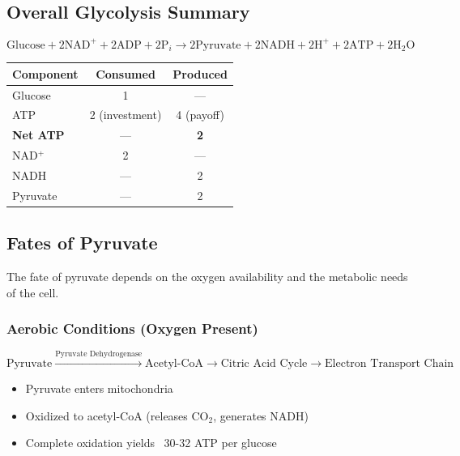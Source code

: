 \subsection{Overall Glycolysis Summary}

\begin{center}
\begin{tcolorbox}[colback=yellow!10, colframe=orange!80!black, title=\textbf{Net Reaction of Glycolysis}]
\[
\text{Glucose} + 2\text{NAD}^+ + 2\text{ADP} + 2\text{P}_i \rightarrow 2\text{Pyruvate} + 2\text{NADH} + 2\text{H}^+ + 2\text{ATP} + 2\text{H}_2\text{O}
\]
\end{tcolorbox}
\end{center}

\begin{center}
\begin{tabular}{lcc}
\toprule
\textbf{Component} & \textbf{Consumed} & \textbf{Produced} \\
\midrule
Glucose & 1 & — \\
ATP & 2 (investment) & 4 (payoff) \\
\textbf{Net ATP} & — & \textbf{2} \\
NAD$^+$ & 2 & — \\
NADH & — & 2 \\
Pyruvate & — & 2 \\
\bottomrule
\end{tabular}
\end{center}

\subsection{Fates of Pyruvate}

\begin{definition}
The fate of pyruvate depends on the oxygen availability and the metabolic needs of the cell.
\end{definition}

\subsubsection{Aerobic Conditions (Oxygen Present)}

\[
\text{Pyruvate} \xrightarrow{\text{Pyruvate Dehydrogenase}} \text{Acetyl-CoA} \rightarrow \text{Citric Acid Cycle} \rightarrow \text{Electron Transport Chain}
\]

\begin{itemize}
    \item Pyruvate enters mitochondria
    \item Oxidized to acetyl-CoA (releases CO$_2$, generates NADH)
    \item Complete oxidation yields ~30-32 ATP per glucose
\end{itemize}

